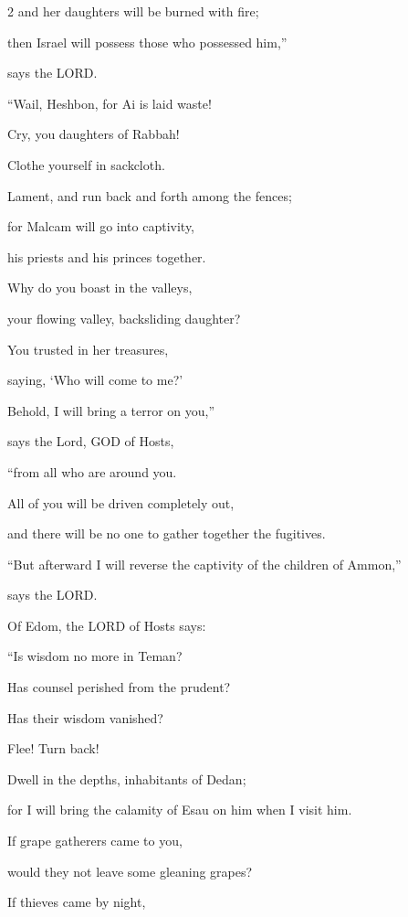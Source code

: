 \begin{multicols}{2}
and her daughters will be burned with fire;

then Israel will possess those who possessed him,”

says the LORD.


\myverse{}“Wail, Heshbon, for Ai is laid waste!

Cry, you daughters of Rabbah!

Clothe yourself in sackcloth.

Lament, and run back and forth among the fences;

for Malcam will go into captivity,

his priests and his princes together.


\myverse{}Why do you boast in the valleys,

your flowing valley, backsliding daughter?

You trusted in her treasures,

saying, ‘Who will come to me?’


\myverse{}Behold, I will bring a terror on you,”

says the Lord, GOD of Hosts,

“from all who are around you.

All of you will be driven completely out,

and there will be no one to gather together the fugitives.

\vspace{\baselineskip}

\myverse{}“But afterward I will reverse the captivity of the children of
Ammon,”

says the LORD.

\vspace{\baselineskip}

\myverse{}Of Edom, the LORD of Hosts says:

“Is wisdom no more in Teman?

Has counsel perished from the prudent?

Has their wisdom vanished?


\myverse{}Flee! Turn back!

Dwell in the depths, inhabitants of Dedan;

for I will bring the calamity of Esau on him when I visit him.


\myverse{}If grape gatherers came to you,

would they not leave some gleaning grapes?

If thieves came by night,


\end{multicols}
